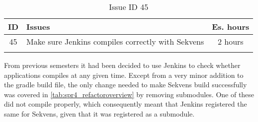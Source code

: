 \begin{longtable} { | c | p{12cm} | c | } 
\hline
	ID 	&	Issues	&		 Es. hours \\\hline
	45	&	Make sure Jenkins compiles correctly with Sekvens	&	2 hours	\\\hline
\caption{Issue ID 45}
\label{tab:spr4_jenkins}
\end{longtable}

From previous semesters it had been decided to use Jenkins to check whether applications compiles at any given time. Except from a very minor addition to the gradle build file, the only change needed to make Sekvens build successfully was covered in \ref{tab:spr4_refactoroverview} by removing submodules. One of these did not compile properly, which consequently meant that Jenkins registered the same for Sekvens, given that it was registered as a submodule.
